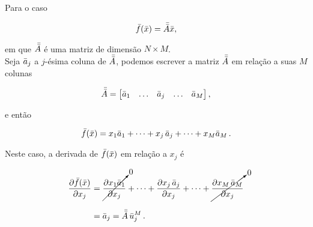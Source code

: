 \begin{example}
    Para o caso

    \begin{equation}
    \bar{f}(\bar{x}) = \bar{\bar{A}} \bar{x} ,
    \end{equation}

    \noindent em que $\bar{\bar{A}}$ é uma matriz de dimensão $N \times M$.
    \\
    \indent
    Seja $\bar{a}_j$ a $j$-ésima coluna de $\bar{\bar{A}}$, podemos escrever a matriz
    $\bar{\bar{A}}$ em relação a suas $M$ colunas

    \begin{equation}
    \bar{\bar{A}} =
        \begin{bmatrix}
        \bar{a}_1 & \ldots & \bar{a}_j & \ldots & \bar{a}_M
        \end{bmatrix} ,
    \end{equation}

    \noindent e então

    \begin{equation}
    \bar{f}(\bar{x}) = x_1\bar{a}_1 + \dotsb + x_j\thinspace\bar{a}_j +
    \dotsb + x_M\bar{a}_M \thinspace .
    \end{equation}

    \indent Neste caso, a derivada de  $\bar{f}(\bar{x})$ em relação
    a $x_j$ é
    
    \begin{equation}
    \begin{split}
    \dfrac{\partial \bar{f}(\bar{x})}{\partial x_j} &=
        \cancelto{0}{\dfrac{\partial x_1\bar{a}_1}{\partial x_j}} + \dotsb +
        \dfrac{\partial x_j\thinspace\bar{a}_j}{\partial x_j} + \dotsb +
        \cancelto{0}{\dfrac{\partial x_M\thinspace\bar{a}_M}{\partial x_j}}
    \\[0.3cm]
    &=
    \bar{a}_j = \bar{\bar{A}}\thinspace\bar{u}_j^M
    \thinspace .
    \end{split}
    \end{equation}
\end{example}

